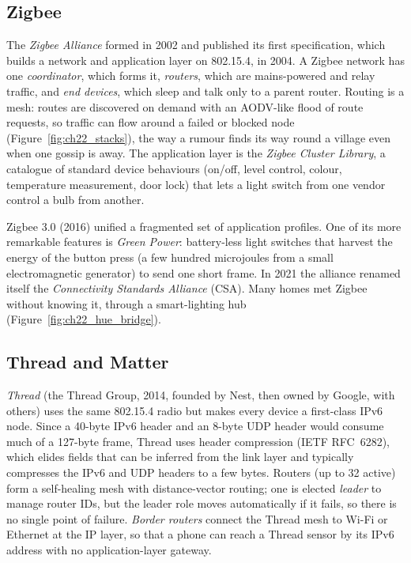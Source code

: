 \subsection{Zigbee}

The \emph{Zigbee Alliance} formed in 2002 and published its first specification, which builds a
network and application layer on 802.15.4, in 2004. A Zigbee network has one \emph{coordinator},
which forms it, \emph{routers}, which are mains-powered and relay traffic, and \emph{end devices},
which sleep and talk only to a parent router. Routing is a mesh: routes are discovered on demand with
an AODV-like flood of route requests, so traffic can flow around a failed or blocked node
(Figure~\ref{fig:ch22_stacks}), the way a rumour finds its way round a village even when one gossip
is away. The application layer is the \emph{Zigbee Cluster Library}, a catalogue of standard device
behaviours (on/off, level control, colour, temperature measurement, door lock) that lets a light
switch from one vendor control a bulb from another.

Zigbee 3.0 (2016) unified a fragmented set of application profiles. One of its more remarkable
features is \emph{Green Power}: battery-less light switches that harvest the energy of the button
press (a few hundred microjoules from a small electromagnetic generator) to send one short frame. In
2021 the alliance renamed itself the \emph{Connectivity Standards Alliance} (CSA). Many homes met
Zigbee without knowing it, through a smart-lighting hub (Figure~\ref{fig:ch22_hue_bridge}).

\subsection{Thread and Matter}

\emph{Thread} (the Thread Group, 2014, founded by Nest, then owned by Google, with others) uses the
same 802.15.4 radio but makes every device a first-class IPv6 node. Since a 40-byte IPv6 header and
an 8-byte UDP header would consume much of a 127-byte frame, Thread uses  header
compression (IETF RFC~6282), which elides fields that can be inferred from the link layer and
typically compresses the IPv6 and UDP headers to a few bytes. Routers (up to 32 active) form a
self-healing mesh with distance-vector routing; one is elected \emph{leader} to manage router IDs,
but the leader role moves automatically if it fails, so there is no single point of failure.
\emph{Border routers} connect the Thread mesh to Wi-Fi or Ethernet at the IP layer, so that a phone
can reach a Thread sensor by its IPv6 address with no application-layer gateway.

